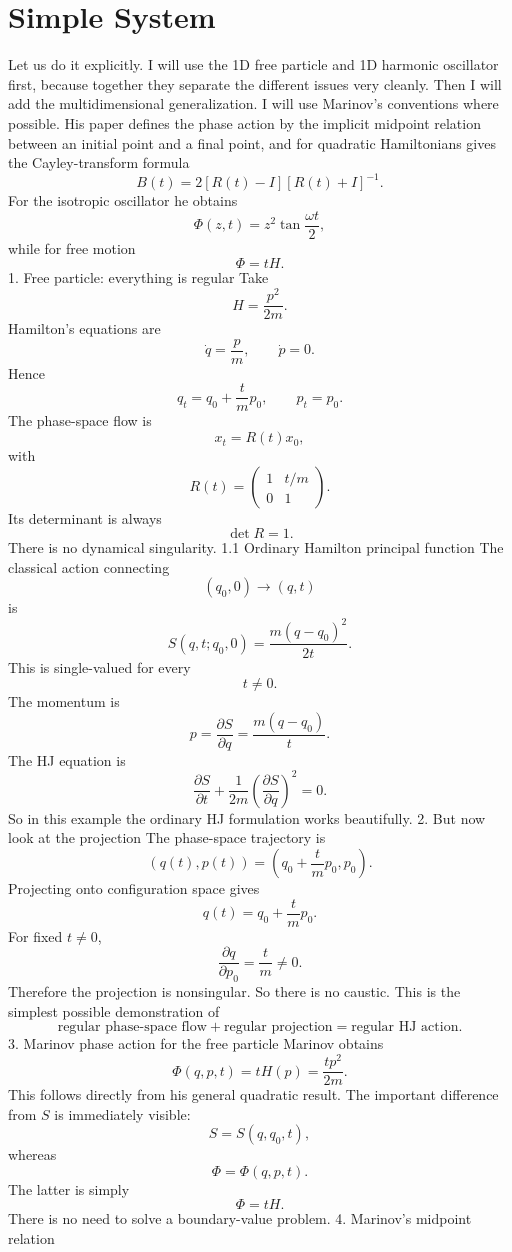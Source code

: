\section{Simple System}
Let us do it explicitly. I will use the 1D free particle and 1D harmonic oscillator first, because together they separate the different issues very cleanly. Then I will add the multidimensional generalization.
I will use Marinov's conventions where possible. His paper defines the phase action by the implicit midpoint relation between an initial point and a final point, and for quadratic Hamiltonians gives the Cayley-transform formula
$$ B(t)=2[R(t)-I][R(t)+I]^{-1}. $$
For the isotropic oscillator he obtains
$$ \Phi(z,t)=z^2\tan\frac{\omega t}{2}, $$
while for free motion
$$ \Phi=tH. $$
1. Free particle: everything is regular
Take
$$ H=\frac{p^2}{2m}. $$
Hamilton's equations are
$$ \dot q=\frac{p}{m}, \qquad \dot p=0. $$
Hence
$$ q_t=q_0+\frac{t}{m}p_0, \qquad p_t=p_0. $$
The phase-space flow is
$$ x_t=R(t)x_0, $$
with
$$ R(t)= \begin{pmatrix} 1&t/m\\ 0&1 \end{pmatrix}. $$
Its determinant is always
$$ \det R=1. $$
There is no dynamical singularity.
1.1 Ordinary Hamilton principal function
The classical action connecting
$$ (q_0,0)\rightarrow(q,t) $$
is
$$ S(q,t;q_0,0) = \frac{m(q-q_0)^2}{2t}. $$
This is single-valued for every
$$ t\neq0. $$
The momentum is
$$ p=\frac{\partial S}{\partial q} = \frac{m(q-q_0)}{t}. $$
The HJ equation is
$$ \frac{\partial S}{\partial t} + \frac{1}{2m} \left(\frac{\partial S}{\partial q}\right)^2=0. $$
So in this example the ordinary HJ formulation works beautifully.
2. But now look at the projection
The phase-space trajectory is
$$ (q(t),p(t)) = \left(q_0+\frac{t}{m}p_0,p_0\right). $$
Projecting onto configuration space gives
$$ q(t)=q_0+\frac{t}{m}p_0. $$
For fixed \(t\neq0\),
$$ \frac{\partial q}{\partial p_0} = \frac{t}{m}\neq0. $$
Therefore the projection is nonsingular.
So there is no caustic.
This is the simplest possible demonstration of
$$ \boxed{ \text{regular phase-space flow} + \text{regular projection} = \text{regular HJ action}. } $$
3. Marinov phase action for the free particle
Marinov obtains
$$ \boxed{ \Phi(q,p,t)=tH(p)=\frac{tp^2}{2m}. } $$
This follows directly from his general quadratic result.
The important difference from \(S\) is immediately visible:
$$ S=S(q,q_0,t), $$
whereas
$$ \Phi=\Phi(q,p,t). $$
The latter is simply
$$ \Phi=tH. $$
There is no need to solve a boundary-value problem.
4. Marinov's midpoint relation
